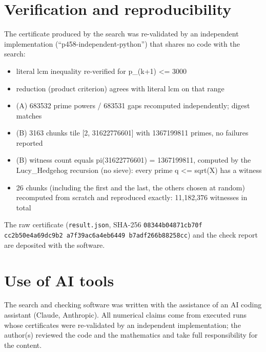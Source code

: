 \documentclass[11pt]{amsart}
\begin{document}
\section{Verification and reproducibility}
The certificate produced by the search was re-validated by an independent
implementation (``p458-independent-python'') that shares no code with the search:
\begin{itemize}
\item literal lcm inequality re-verified for p\_(k+1) <= 3000
\item reduction (product criterion) agrees with literal lcm on that range
\item (A) 683532 prime powers / 683531 gaps recomputed independently; digest matches
\item (B) 3163 chunks tile [2, 31622776601] with 1367199811 primes, no failures reported
\item (B) witness count equals pi(31622776601) = 1367199811, computed by the Lucy\_Hedgehog recursion (no sieve): every prime q <= sqrt(X) has a witness
\item 26 chunks (including the first and the last, the others chosen at random) recomputed from scratch and reproduced exactly: 11,182,376 witnesses in total
\end{itemize}
The raw certificate (\texttt{result.json}, SHA-256
\texttt{08344b04871cb70f cc2b50e4a69dc9b2 a7f39ac6a4eb6449 b7adf266b88258cc}) and the check report are deposited
with the software. %

\section*{Use of AI tools}
The search and checking software was written with the assistance of an AI coding assistant (Claude, Anthropic). All numerical claims come from executed runs whose certificates were re-validated by an independent implementation; the author(s) reviewed the code and the mathematics and take full responsibility for the content.

\nocite{ErGr80,SorensonWebster2017,OeSHP2014,Pocklington1914,BLS75,erdosproblems458}


\end{document}
